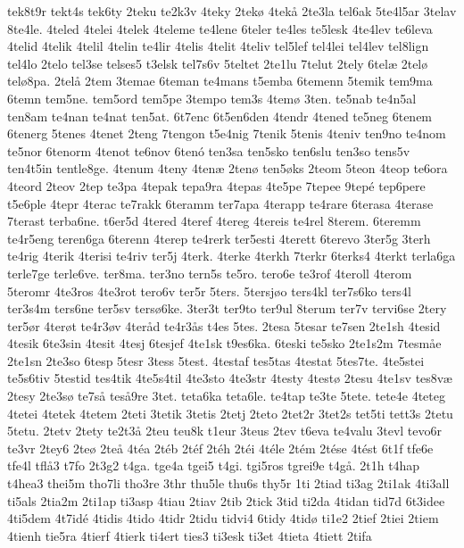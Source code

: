 {tek8t9r
tekt4s
tek6ty
2teku
te2k3v
4teky
2tek^^f8
4tek^^e5
2te3la
tel6ak
5te4l5ar
3telav
8te4le.
4teled
4telei
4telek
4teleme
te4lene
6teler
te4les
te5lesk
4te4lev
te6leva
4telid
4telik
4telil
4telin
te4lir
4telis
4telit
4teliv
tel5lef
tel4lei
tel4lev
tel8lign
tel4lo
2telo
tel3se
telses5
t3elsk
tel7s6v
5teltet
2te1lu
7telut
2tely
6tel^^e6
2tel^^f8
tel^^f88pa.
2tel^^e5
2tem
3temae
6teman
te4mans
t5emba
6temenn
5temik
tem9ma
6temn
tem5ne.
tem5ord
tem5pe
3tempo
tem3s
4tem^^f8
3ten.
te5nab
te4n5al
ten8am
te4nan
te4nat
ten5at.
6t7enc
6t5en6den
4tendr
4tened
te5neg
6tenem
6tenerg
5tenes
4tenet
2teng
7tengon
t5e4nig
7tenik
5tenis
4teniv
ten9no
te4nom
te5nor
6tenorm
4tenot
te6nov
6ten^^f3
ten3sa
ten5sko
ten6slu
ten3so
tens5v
ten4t5in
tentle8ge.
4tenum
4teny
4ten^^e6
2ten^^f8
ten5^^f8ks
2teom
5teon
4teop
te6ora
4teord
2teov
2tep
te3pa
4tepak
tepa9ra
4tepas
4te5pe
7tepee
9tep^^e9
tep6pere
t5e6ple
4tepr
4terac
te7rakk
6teramm
ter7apa
4terapp
te4rare
6terasa
4terase
7terast
terba6ne.
t6er5d
4tered
4teref
4tereg
4tereis
te4rel
8terem.
6teremm
te4r5eng
teren6ga
6terenn
4terep
te4rerk
ter5esti
4terett
6terevo
3ter5g
3terh
te4rig
4terik
4terisi
te4riv
ter5j
4terk.
4terke
4terkh
7terkr
6terks4
4terkt
terla6ga
terle7ge
terle6ve.
ter8ma.
ter3no
tern5s
te5ro.
tero6e
te3rof
4teroll
4terom
5teromr
4te3ros
4te3rot
tero6v
ter5r
5ters.
5tersj^^f8o
ters4kl
ter7s6ko
ters4l
ter3s4m
ters6ne
ter5sv
ters^^f86ke.
3ter3t
ter9to
ter9ul
8terum
ter7v
tervi6se
2tery
ter5^^f8r
4ter^^f8t
te4r3^^f8v
4ter^^e5d
te4r3^^e5s
t4es
5tes.
2tesa
5tesar
te7sen
2te1sh
4tesid
4tesik
6te3sin
4tesit
4tesj
6tesjef
4te1sk
t9es6ka.
6teski
te5sko
2te1s2m
7tesm^^e5e
2te1sn
2te3so
6tesp
5tesr
3tess
5test.
4testaf
tes5tas
4testat
5tes7te.
4te5stei
te5s6tiv
5testid
tes4tik
4te5s4til
4te3sto
4te3str
4testy
4test^^f8
2tesu
4te1sv
tes8v^^e6
2tesy
2te3s^^f8
te7s^^e5
tes^^e59re
3tet.
teta6ka
teta6le.
te4tap
te3te
5tete.
tete4e
4teteg
4tetei
4tetek
4tetem
2teti
3tetik
3tetis
2tetj
2teto
2tet2r
3tet2s
tet5ti
tett3s
2tetu
5tetu.
2tetv
2tety
te2t3^^e5
2teu
teu8k
t1eur
3teus
2tev
t6eva
te4valu
3tevl
tevo6r
te3vr
2tey6
2te^^f8
2te^^e5
4t^^e9a
2t^^e9b
2t^^e9f
2t^^e9h
2t^^e9i
4t^^e9le
2t^^e9m
2t^^e9se
4t^^e9st
6t1f
tfe6e
tfe4l
tfl^^e53
t7fo
2t3g2
t4ga.
tge4a
tgei5
t4gi.
tgi5ros
tgrei9e
t4g^^e5.
2t1h
t4hap
t4hea3
thei5m
tho7li
tho3re
3thr
thu5le
thu6s
thy5r
1ti
2tiad
ti3ag
2ti1ak
4ti3all
ti5als
2tia2m
2ti1ap
ti3asp
4tiau
2tiav
2tib
2tick
3tid
ti2da
4tidan
tid7d
6t3idee
4ti5dem
4t7id^^e9
4tidis
4tido
4tidr
2tidu
tidvi4
6tidy
4tid^^f8
ti1e2
2tief
2tiei
2tiem
4tienh
tie5ra
4tierf
4tierk
ti4ert
ties3
ti3esk
ti3et
4tieta
4tiett
2tifa
}
